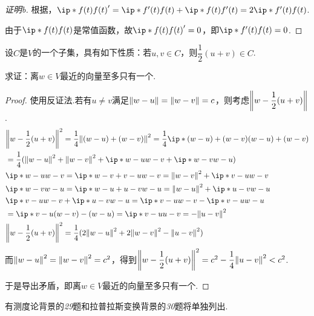 \begin{proof}[证明b]
    根据，\(\ip*{f(t)}{f(t)}'=\ip*{f'(t)}{f(t)}+\ip*{f(t)}{f'(t)}=2\ip*{f'(t)}{f(t)}\).

    由于\(\ip*{f(t)}{f(t)}\)是常值函数，故\(\ip*{f(t)}{f(t)}'=0\)，即\(\ip*{f'(t)}{f(t)}=0\).
\end{proof}

\begin{problem}[28]\label{6.A.28}
    设\(C\)是\(V\)的一个子集，具有如下性质：若\(u,v \in C\)，则\(\dfrac{1}{2}(u+v) \in C\).

    求证：离\(w \in V\)最近的向量至多只有一个.
\end{problem}

\begin{proof}
    使用反证法.若有\(u \ne v\)满足\(\norm*{w-u}=\norm*{w-v}=c\)，则考虑\(\norm*{w-\dfrac{1}{2}(u+v)}\).
    \begin{align*}
        &\norm*{w-\dfrac{1}{2}(u+v)}^2=\dfrac{1}{4}\norm*{(w-u)+(w-v)}^2=\dfrac{1}{4}\ip*{(w-u)+(w-v)}{(w-u)+(w-v)} \\
        &=\dfrac{1}{4}(\norm*{w-u}^2+\norm*{w-v}^2+\ip*{w-u}{w-v}+\ip*{w-v}{w-u}) \\
        &\ip*{w-u}{w-v}=\ip*{w-v+v-u}{w-v}=\norm*{w-v}^2+\ip*{v-u}{w-v} \\
        &\ip*{w-v}{w-u}=\ip*{w-u+u-v}{w-u}=\norm*{w-u}^2+\ip*{u-v}{w-u} \\
        &\ip*{v-u}{w-v}+\ip*{u-v}{w-u}=\ip*{v-u}{w-v}-\ip*{v-u}{w-u} \\
        &=\ip*{v-u}{(w-v)-(w-u)}=\ip*{v-u}{u-v}=-\norm*{u-v}^2 \\
        &\norm*{w-\dfrac{1}{2}(u+v)}^2=\dfrac{1}{4}(2\norm*{w-u}^2+2\norm*{w-v}^2-\norm*{u-v}^2)
    \end{align*}
    而\(\norm*{w-u}^2=\norm*{w-v}^2=c^2\)，得到\(\norm*{w-\dfrac{1}{2}(u+v)}^2=c^2-\dfrac{1}{4}\norm*{u-v}^2<c^2\).

    于是导出矛盾，即离\(w \in V\)最近的向量至多只有一个.
\end{proof}

{\kaishu 有测度论背景的\textit{29}题和拉普拉斯变换背景的\textit{30}题将单独列出.}

